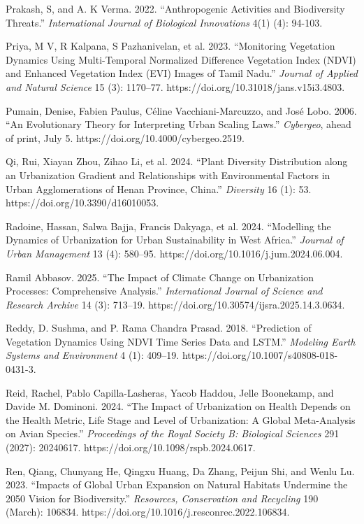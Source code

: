 Prakash, S, and A. K Verma. 2022. ``Anthropogenic Activities and Biodiversity Threats.'' \emph{International Journal of Biological Innovations} 4(1) (4): 94-103.

Priya, M V, R Kalpana, S Pazhanivelan, et al. 2023. ``Monitoring Vegetation Dynamics Using Multi-Temporal Normalized Difference Vegetation Index (NDVI) and Enhanced Vegetation Index (EVI) Images of Tamil Nadu.'' \emph{Journal of Applied and Natural Science} 15 (3): 1170--77. https://doi.org/10.31018/jans.v15i3.4803.

Pumain, Denise, Fabien Paulus, Céline Vacchiani-Marcuzzo, and José Lobo. 2006. ``An Evolutionary Theory for Interpreting Urban Scaling Laws.'' \emph{Cybergeo}, ahead of print, July 5. https://doi.org/10.4000/cybergeo.2519.

Qi, Rui, Xiayan Zhou, Zihao Li, et al. 2024. ``Plant Diversity Distribution along an Urbanization Gradient and Relationships with Environmental Factors in Urban Agglomerations of Henan Province, China.'' \emph{Diversity} 16 (1): 53. https://doi.org/10.3390/d16010053.

Radoine, Hassan, Salwa Bajja, Francis Dakyaga, et al. 2024. ``Modelling the Dynamics of Urbanization for Urban Sustainability in West Africa.'' \emph{Journal of Urban Management} 13 (4): 580--95. https://doi.org/10.1016/j.jum.2024.06.004.

Ramil Abbasov. 2025. ``The Impact of Climate Change on Urbanization Processes: Comprehensive Analysis.'' \emph{International Journal of Science and Research Archive} 14 (3): 713--19. https://doi.org/10.30574/ijsra.2025.14.3.0634.

Reddy, D. Sushma, and P. Rama Chandra Prasad. 2018. ``Prediction of Vegetation Dynamics Using NDVI Time Series Data and LSTM.'' \emph{Modeling Earth Systems and Environment} 4 (1): 409--19. https://doi.org/10.1007/s40808-018-0431-3.

Reid, Rachel, Pablo Capilla-Lasheras, Yacob Haddou, Jelle Boonekamp, and Davide M. Dominoni. 2024. ``The Impact of Urbanization on Health Depends on the Health Metric, Life Stage and Level of Urbanization: A Global Meta-Analysis on Avian Species.'' \emph{Proceedings of the Royal Society B: Biological Sciences} 291 (2027): 20240617. https://doi.org/10.1098/rspb.2024.0617.

Ren, Qiang, Chunyang He, Qingxu Huang, Da Zhang, Peijun Shi, and Wenlu Lu. 2023. ``Impacts of Global Urban Expansion on Natural Habitats Undermine the 2050 Vision for Biodiversity.'' \emph{Resources, Conservation and Recycling} 190 (March): 106834. https://doi.org/10.1016/j.resconrec.2022.106834.

